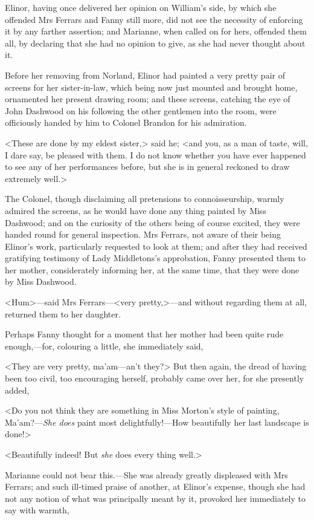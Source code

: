 Elinor, having once delivered her opinion on William's side, by which she offended Mrs Ferrars and Fanny still more, did not see the necessity of enforcing it by any farther assertion; and Marianne, when called on for hers, offended them all, by declaring that she had no opinion to give, as she had never thought about it.

Before her removing from Norland, Elinor had painted a very pretty pair of screens for her sister-in-law, which being now just mounted and brought home, ornamented her present drawing room; and these screens, catching the eye of John Dashwood on his following the other gentlemen into the room, were officiously handed by him to Colonel Brandon for his admiration.

<These are done by my eldest sister,> said he; <and you, as a man of taste, will, I dare say, be pleased with them. I do not know whether you have ever happened to see any of her performances before, but she is in general reckoned to draw extremely well.>

The Colonel, though disclaiming all pretensions to connoisseurship, warmly admired the screens, as he would have done any thing painted by Miss Dashwood; and on the curiosity of the others being of course excited, they were handed round for general inspection. Mrs Ferrars, not aware of their being Elinor's work, particularly requested to look at them; and after they had received gratifying testimony of Lady Middletons's approbation, Fanny presented them to her mother, considerately informing her, at the same time, that they were done by Miss Dashwood.

<Hum>—said Mrs Ferrars—<very pretty,>—and without regarding them at all, returned them to her daughter.

Perhaps Fanny thought for a moment that her mother had been quite rude enough,—for, colouring a little, she immediately said,

<They are very pretty, ma'am—an't they?> But then again, the dread of having been too civil, too encouraging herself, probably came over her, for she presently added,

<Do you not think they are something in Miss Morton's style of painting, Ma'am?—\textit{She does} paint most delightfully!—How beautifully her last landscape is done!>

<Beautifully indeed! But \textit{she} does every thing well.>

Marianne could not bear this.—She was already greatly displeased with Mrs Ferrars; and such ill-timed praise of another, at Elinor's expense, though she had not any notion of what was principally meant by it, provoked her immediately to say with warmth,

